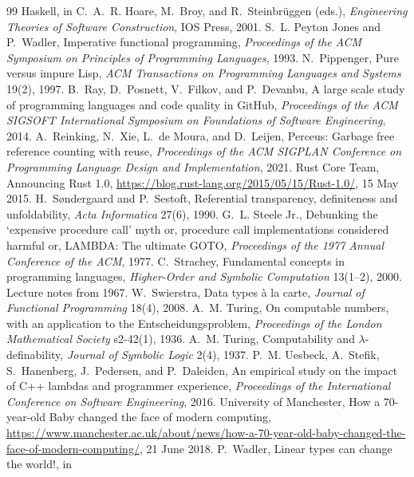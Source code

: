 \documentclass[11pt]{article}
\theoremstyle{definition}
\theoremstyle{remark}
\begin{document}
\begin{thebibliography}{99}
  Haskell, in C.~A.~R. Hoare, M.~Broy, and R.~Steinbr\"uggen (eds.),
  \emph{Engineering Theories of Software Construction}, IOS Press, 2001.
   S.~L. Peyton Jones and P.~Wadler, Imperative
  functional programming, \emph{Proceedings of the ACM Symposium on
  Principles of Programming Languages}, 1993.
   N.~Pippenger, Pure versus impure Lisp, \emph{ACM
  Transactions on Programming Languages and Systems} 19(2), 1997.
   B.~Ray, D.~Posnett, V.~Filkov, and P.~Devanbu, A large
  scale study of programming languages and code quality in GitHub,
  \emph{Proceedings of the ACM SIGSOFT International Symposium on
  Foundations of Software Engineering}, 2014.
   A.~Reinking, N.~Xie, L.~de Moura, and D.~Leijen,
  Perceus: Garbage free reference counting with reuse, \emph{Proceedings of
    the ACM SIGPLAN Conference on Programming Language Design and
  Implementation}, 2021.
   Rust Core Team, Announcing Rust 1.0,
  \url{https://blog.rust-lang.org/2015/05/15/Rust-1.0/}, 15 May 2015.
   H.~S{\o}ndergaard and P.~Sestoft, Referential
  transparency, definiteness and unfoldability, \emph{Acta Informatica}
  27(6), 1990.
   G.~L. Steele Jr., Debunking the `expensive procedure
  call' myth or, procedure call implementations considered harmful or,
  LAMBDA: The ultimate GOTO, \emph{Proceedings of the 1977 Annual
  Conference of the ACM}, 1977.
   C.~Strachey, Fundamental concepts in programming
  languages, \emph{Higher-Order and Symbolic Computation} 13(1--2), 2000.
  Lecture notes from 1967.
   W.~Swierstra, Data types \`a la carte, \emph{Journal
  of Functional Programming} 18(4), 2008.
   A.~M. Turing, On computable numbers, with an
  application to the Entscheidungsproblem, \emph{Proceedings of the London
  Mathematical Society} s2-42(1), 1936.
   A.~M. Turing, Computability and $\lambda$-definability,
  \emph{Journal of Symbolic Logic} 2(4), 1937.
   P.~M. Uesbeck, A.~Stefik, S.~Hanenberg, J.~Pedersen,
  and P.~Daleiden, An empirical study on the impact of C++ lambdas and
  programmer experience, \emph{Proceedings of the International Conference
  on Software Engineering}, 2016.
   University of Manchester, How a 70-year-old Baby changed
  the face of modern computing,
  \url{https://www.manchester.ac.uk/about/news/how-a-70-year-old-baby-changed-the-face-of-modern-computing/},
  21 June 2018.
   P.~Wadler, Linear types can change the world!, in

\end{thebibliography}
\end{document}
